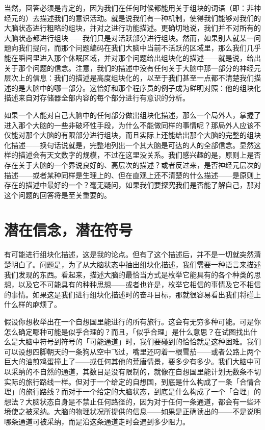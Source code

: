 \documentclass[
  12pt,
  twoside,
  openright,
  oldfontcommands,
]{memoir}
\begin{document}
当然，回答必须是肯定的，因为我们在任何时候都能用关于组块的词语（即：非神经元的）去描述我们的意识活动。就是说我们有一种机制，使得我们能够对我们的大脑状态进行粗略的组块，并对之进行功能描述。更确切地说，我们并不对所有的大脑状态都进行组块------我们只是对活跃部分进行组块。然而，如果别人就某一问题向我们提问，而那个问题编码在我们大脑中当前不活跃的区域里，那么我们几乎能在瞬间里进入那个休眠区域，并对那个问题给出组块化的描述------就是说，给出关于那个问题的信念。注意，我们的描述中没有任何关于大脑中那一部分的神经元层次上的信息：我们的描述是高度组块化的，以至于我们甚至一点都不清楚我们描述的是大脑中的哪一部分。这恰好和那个程序员的例子成为鲜明对照：他的组块化描述来自对存储器全部内容的每个部分进行有意识的分析。

如果一个人能对自己大脑中的任何部分做出组块化描述，那么一个局外人，掌握了进入那个大脑的一些非破坏性手段，为什么不能做同样的事情呢？那局外人应该不仅能对那个大脑的有限部分进行组块，而且实际上还能给出那个大脑的完整的组块化描述------换句话说就是，完整地列出一个其大脑是可达的人的全部信念。显然这样的描述会有天文数字的规模，不过在这里没关系。我们感兴趣的是，原则上是否存在关于大脑的一个界说良好的、高层次的描述？或者反过来，是否神经元层次的描述------或者某种同样是生理上的、但在直观上还不清楚的什么描述------是原则上存在的描述中最好的一个？毫无疑问，如果我们要探究我们是否能了解自己，那对这个问题的回答将是至关重要的。

\section{潜在信念，潜在符号}

有可能进行组块化描述，这是我的论点。但有了这个描述后，并不是一切就突然清楚明白了。问题是，为了从大脑状态中抽出组块化描述，我们需要一种语言来描述我们发现的东西。看起来，描述大脑的最恰当方式是枚举它能具有的各个种类的思想，以及它不可能具有的种种思想------或者也许是，枚举它相信的事情及它不相信的事情。如果这是我们进行组块化描述时的奋斗目标，那就很容易看出我们将碰上什么样的麻烦了。

假设你想枚举出在一个自想国里能进行的所有旅行。这会有无穷多种可能。可是你怎么确定哪种可能是似乎合理的？而且，「似乎合理」是什么意思？在试图找出什么是大脑中符号到符号的「可能通道」时，我们要碰到的恰恰就是这种困难。我们可以设想四脚朝天的一条狗从空中飞过，嘴里还叼着一根雪茄------或者公路上两个巨大的油煎鸡蛋撞上了------或任何其他的荒唐情景，要多少有多少。我们大脑中可以采纳的不自然的通道，其数目是没有限制的，就像在自想国里能计划无数条不切实际的旅行路线一样。但对于一个给定的自想国，到底是什么构成了一条「合情合理」的旅行路线？而对于一个给定的大脑状态，到底是什么构成了一个「合理」的想法？大脑状态自身是不禁止任何路径的，因为对于任何一条通道，都会有一些环境使之被采纳。大脑的物理状况所提供的信息------如果是正确读出的------不是说明哪条通道可被采纳，而是沿这条通道走时会遇到多少阻力。
\end{document}
